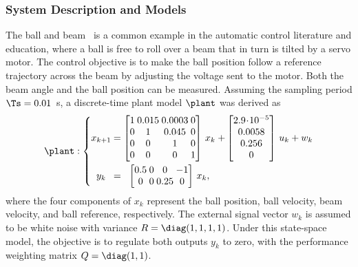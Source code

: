 \subsubsection*{System Description and Models}
The ball and beam~\cite{Wellstead:1978} is a common example in the automatic control literature and education, where a ball is free to roll over a beam that in turn is tilted by a servo motor.
The control objective is to make the ball position follow a reference trajectory across the beam by adjusting the voltage sent to the motor. Both the beam angle and the ball position can be measured.
Assuming the sampling period $\Ts = 0.01$~s, a discrete-time plant model $\plant$ was derived as
%
\begin{equation*}
\setlength\arraycolsep{1.25pt}
    \label{eq:bnb-plant}
    \plant : 
    \left\{
    \begin{matrix}
        x_{k+1} &=& 
        \begin{bmatrix}
            1 & 0.015 & 0.0003 & 0\\
            0 & 1 & 0.045 & 0\\
            0 & 0 & 1 & 0 \\
            0 & 0 & 0 & 1
        \end{bmatrix}\,x_k &+ 
        \begin{bmatrix}
            2.9\!\cdot\!10^{-5} \\
            0.0058 \\
            0.256 \\
            0
        \end{bmatrix}\,u_k + w_k \\ \vspace{-3mm} \\
        y_k &=& 
        \begin{bmatrix}
            0.5 & 0 & 0 & -1\\
            0 & 0 & 0.25 & 0
        \end{bmatrix}\,x_k, & 
    \end{matrix}
    \right.
\end{equation*}
where the four components of $x_k$ represent the ball position, ball velocity, beam velocity, and ball reference, respectively. The external signal vector $w_k$ is assumed to be white noise with variance $R = \diag(1,1,1,1)$. Under this state-space model, the objective is to regulate both outputs $y_k$ to zero, with the performance weighting matrix $Q = \diag(1,1)$.


